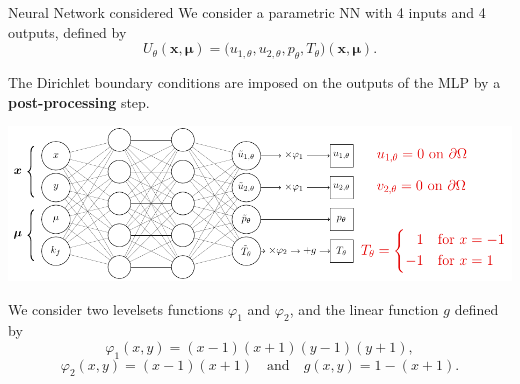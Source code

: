 \begin{frame}{Neural Network considered}
    \vspace{-2pt}
    We consider a parametric NN with 4 inputs and 4 outputs, defined by
    $$U_\theta(\bm{x},\bm{\mu}) = \big(u_{1,\theta},u_{2,\theta},p_\theta,T_\theta)(\bm{x},\bm{\mu}).$$
    
    The Dirichlet boundary conditions are imposed on the outputs of the MLP by a \textbf{post-processing} step. \citep{Sukumar_2022}
    
    \begin{center}
        \includegraphics[width=0.85\linewidth]{images/pinn/network/network.pdf}
    \end{center}

    \vspace{-5pt}
    We consider two levelsets functions $\varphi_1$ and $\varphi_2$, and the linear function $g$ defined by
    \begin{equation*}
        \varphi_1(x,y) = (x-1)(x+1)(y-1)(y+1),
    \end{equation*}
    \begin{equation*}
        \varphi_2(x,y) = (x-1)(x+1) \quad \text{and} \quad g(x,y) = 1 - (x+1).
    \end{equation*}
\end{frame}

